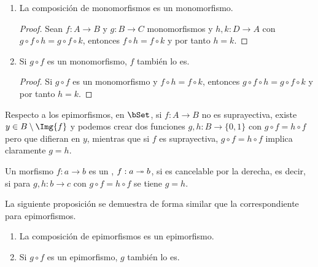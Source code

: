 \begin{proposition}\label{prop:mono-comp}\;
  \begin{enumerate}
  \item La composición de monomorfismos es un monomorfismo.
    \begin{proof}
      Sean $f:A\to B$ y $g:B\to C$ monomorfismos y $h,k:D\to A$ con
      $g\circ f\circ h=g\circ f\circ k$, entonces $f\circ h=f\circ k$ y por
      tanto $h=k$.
    \end{proof}
  \item Si $g\circ f$ es un monomorfismo, $f$ también lo es.
    \begin{proof}
      Si $g\circ f$ es un monomorfismo y $f\circ h=f\circ k$, entonces
      $g\circ f\circ h=g\circ f\circ k$ y por tanto $h=k$.
    \end{proof}
  \end{enumerate}
\end{proposition}

Respecto a los epimorfismos, en $\bSet$, si $f:A\to B$ no es suprayectiva,
existe $y\in B\setminus\Img{f}$ y podemos crear dos funciones $g,h:B\to\{0,1\}$
con $g\circ f=h\circ f$ pero que difieran en $y$, mientras que si $f$ es
suprayectiva, $g\circ f=h\circ f$ implica claramente $g=h$.

\begin{definition}
  Un morfismo $f:a\to b$ es un , $f:a\twoheadrightarrow b$, si es
  cancelable por la derecha, es decir, si para $g,h:b\to c$ con
  $g\circ f=h\circ f$ se tiene $g=h$.
\end{definition}

La siguiente proposición se demuestra de forma similar que la
correspondiente para epimorfismos.

\begin{proposition}\label{prop:epi-comp}\;
  \begin{enumerate}
  \item La composición de epimorfismos es un epimorfismo.
  \item Si $g\circ f$ es un epimorfismo, $g$ también lo es.
  \end{enumerate}
\end{proposition}

